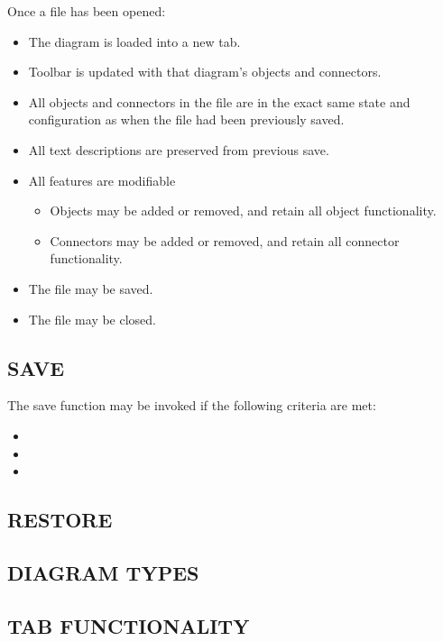 \documentclass[twoside,letterpaper]{article}
\begin{document}
Once a file has been opened:

\begin{itemize}
\item The diagram is loaded into a new tab.
\item Toolbar is updated with that diagram's objects and connectors.
\item All objects and connectors in the file are in the exact same state and configuration as when the file had been previously saved.
\item All text descriptions are preserved from previous save.
\item All features are modifiable
\begin{itemize}
\item Objects may be added or removed, and retain all object functionality.
\item Connectors may be added or removed, and retain all connector functionality.
\end{itemize}
\item The file may be saved.
\item The file may be closed.
\end{itemize}

\bigskip

\subsection[SAVE]{\bfseries SAVE}

The save function may be invoked if the following criteria are met: 
\begin{itemize}
\item 
\item 
\item 
\end{itemize}

\bigskip

\subsection[RESTORE]{\bfseries RESTORE}

\bigskip

\subsection[DIAGRAM TYPES]{\bfseries DIAGRAM TYPES}

\bigskip

\subsection[TAB FUNCTIONALITY]{\bfseries TAB FUNCTIONALITY}
\end{document}

